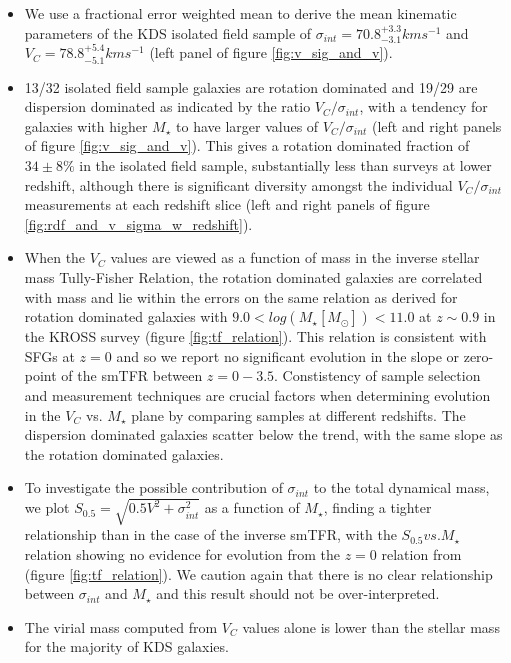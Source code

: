 \documentclass[fleqn,usenatbib]{mn2e}
\begin{document}
\begin{itemize}
    \item We use a fractional error weighted mean to derive the mean kinematic parameters of the KDS isolated field sample of $\sigma_{int} = 70.8^{+3.3}_{-3.1} kms^{-1}$ and $V_{C} = 78.8^{+5.4}_{-5.1}kms^{-1}$ (left panel of figure \ref{fig:v_sig_and_v}).
    \item 13/32 isolated field sample galaxies are rotation dominated and 19/29 are dispersion dominated as indicated by the ratio $V_{C}/\sigma_{int}$, with a tendency for galaxies with higher $M_{\star}$ to have larger values of $V_{C}/\sigma_{int}$ (left and right panels of figure \ref{fig:v_sig_and_v}).
    This gives a rotation dominated fraction of $34 \pm 8 \%$ in the isolated field sample, substantially less than surveys at lower redshift, although there is significant diversity amongst the individual $V_{C}/\sigma_{int}$ measurements at each redshift slice (left and right panels of figure \ref{fig:rdf_and_v_sigma_w_redshift}).
    \item When the $V_{C}$ values are viewed as a function of mass in the inverse stellar mass Tully-Fisher Relation, the rotation dominated galaxies are correlated with mass and lie within the errors on the same relation as derived for rotation dominated galaxies with $9.0 < log(M_{\star}[M_{\odot}]) < 11.0$ at $z\sim0.9$ in the KROSS survey (figure \ref{fig:tf_relation}). %
    This relation is consistent with SFGs at $z=0$ and so we report no significant evolution in the slope or zero-point of the smTFR between $z=0-3.5$.
    Constistency of sample selection and measurement techniques are crucial factors when determining evolution in the $V_{C}$ vs. $M_{\star}$ plane by comparing samples at different redshifts.
    The dispersion dominated galaxies scatter below the trend, with the same slope as the rotation dominated galaxies.
    \item To investigate the possible contribution of $\sigma_{int}$ to the total dynamical mass, we plot $S_{0.5} = \sqrt{0.5V^{2} + \sigma_{int}^{2}}$ as a function of $M_{\star}$, finding a tighter relationship than in the case of the inverse smTFR, with the $S_{0.5} vs. M_{\star}$ relation showing no evidence for evolution from the $z=0$ relation from \cite{Kassin2007} (figure \ref{fig:tf_relation}).
    We caution again that there is no clear relationship between $\sigma_{int}$ and $M_{\star}$ and this result should not be over-interpreted.
    \item The virial mass computed from $V_{C}$ values alone is lower than the stellar mass for the majority of KDS galaxies.

\end{itemize}
\end{document}
